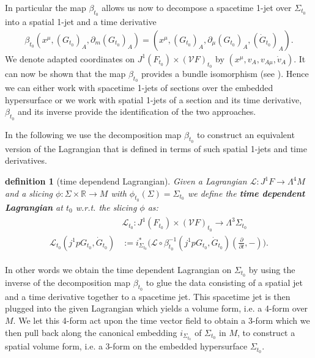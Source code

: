 \documentclass[a4paper,12pt, DIV=14, BCOR=5mm, twoside, headsepline]{scrbook}
\newtheorem{definition}{definition}[section]
\begin{document}
In particular the map $\beta_{t_0}$ allows us now to decompose a spacetime 1-jet over $\Sigma_{t_0}$ into a spatial 1-jet and a time derivative
\begin{align}
    \beta_{t_0}(x^{\mu},(G_{t_0})_A, \partial_m(G_{t_0})_A) = (x^{\mu},(G_{t_0})_A, \partial_{\mu}(G_{t_0})_A, (\dot{G}_{t_0})_A).
\end{align}
We denote adapted coordinates on $J^1(F_{t_0}) \times (\mathcal{V}F)_{t_0}$ by $(x^{\mu}, v_A, v_{A{\mu}}, \dot{v}_A)$. It can now be shown that the map $\beta_{t_0}$ provides a bundle isomorphism (see \cite{2004math.ph..11032G}). Hence we can either work with spacetime 1-jets of sections over the embedded hypersurface or we work with spatial 1-jets of a section and its time derivative, $\beta_{t_0}$ and its inverse provide the identification of the two approaches.

In the following we use the decomposition map $\beta_{t_0}$ to construct an equivalent version of the Lagrangian that is defined in terms of such spatial 1-jets and time derivatives. 
\begin{definition}[time dependend Lagrangian]
Given a Lagrangian $\mathcal{L} : J^1F \rightarrow \Lambda^4M$ and a slicing $\phi : \Sigma \times \mathbb{R} \rightarrow M$ with $\phi_{t_0}(\Sigma) = \Sigma_{t_0}$ we define the \textbf{\textit{time dependent Lagrangian}} at $t_0$ w.r.t. the slicing $\phi$ as:
\begin{align}
\begin{aligned}
    &\mathcal{L}_{t_0} : J^1(F_{t_0}) \times (\mathcal{V}F)_{t_0} \longrightarrow \Lambda^3\Sigma_{t_0}\\
    \mathcal{L}_{t_0}(j^1pG_{t_0}, \dot{G}_{t_0}) &:= i_{\Sigma_{t_0}}^{\ast} \bigl( \mathcal{L}\circ \beta_{t_0}^{-1}(j^1pG_{t_0}, \dot{G}_{t_0})(\frac{\partial}{\partial t},-)\bigr). 
\end{aligned}
\end{align}
\end{definition}
%
%
%
%
In other words we obtain the time dependent Lagrangian on $\Sigma_{t_0}$ by using the inverse of the decomposition map $\beta_{t_0}$ to glue the data consisting of a spatial jet and a time derivative together to a spacetime jet. This spacetime jet is then plugged into the given Lagrangian which yields a volume form, i.e. a 4-form over $M$. We let this 4-form act upon the time vector field to obtain a 3-form which we then pull back along the canonical embedding $i_{\Sigma_{t_0}}$ of $\Sigma_{t_0}$ in $M$, to construct a spatial volume form, i.e. a 3-form on the embedded hypersurface $\Sigma_{t_0}$. 
\end{document}
